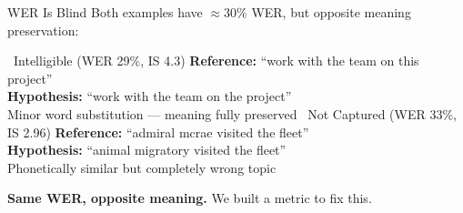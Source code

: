\begin{frame}[shrink=5]{WER Is Blind}
  \vspace{2pt}
  {\small Both examples have $\approx$30\% WER, but \alert{opposite meaning preservation}:}

  \vspace{6pt}

  \comparisonbox
    {~Intelligible (WER 29\%, IS 4.3)}
    {
      \textbf{Reference:} ``work with the team on this project''\\[2pt]
      \textbf{Hypothesis:} ``work with the team on the project''\\[4pt]
      {\scriptsize Minor word substitution --- meaning fully preserved}
    }
    {~Not Captured (WER 33\%, IS 2.96)}
    {
      \textbf{Reference:} ``admiral mcrae visited the fleet''\\[2pt]
      \textbf{Hypothesis:} ``animal migratory visited the fleet''\\[4pt]
      {\scriptsize Phonetically similar but \alert{completely wrong topic}}
    }

  \vspace{8pt}
  \centering
  {\textcolor{ArgosTeal}{\textbf{Same WER, opposite meaning.}} We built a metric to fix this.}

\end{frame}


